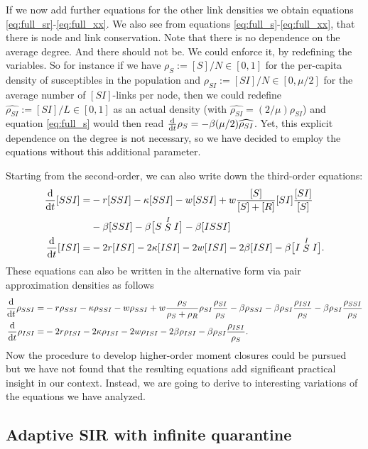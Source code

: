 \documentclass[12pt]{article}
\def\txtd{{\textnormal{d}}}
\begin{document}
If we now add further equations for the other link densities we obtain equations \eqref{eq:full_sr}-\eqref{eq:full_xx}. We also see from equations \eqref{eq:full_s}-\eqref{eq:full_xx}, that there is node and link conservation. Note that there is no dependence on the average degree. And there should not be. We could enforce it, by redefining the variables. So for instance if we have $\rho_S:= [S]/N \in [0,1]$ for the per-capita density of susceptibles in the population and $\rho_{SI}:=[SI]/N\in[0,\mu/2]$ for the average number of $[SI]$-links per node, then we could redefine $\widehat{\rho_{SI}}:=[SI]/L\in[0,1]$ as an actual density (with $\widehat{\rho_{SI}}=(2/\mu)\rho_{SI}$) and equation \eqref{eq:full_s} would then read $\frac{\txtd }{\txtd t} \rho_S= -\beta (\mu/2)\widehat{\rho_{SI}}$. Yet, this explicit dependence on the degree is not necessary, so we have decided to employ the equations without this additional parameter.\medskip

Starting from the second-order, we can also write down the third-order equations:
\begin{align*}
\frac{\txtd }{\txtd t}{[SSI]}=&
-r[SSI]- \kappa [SSI] - w[SSI] 
+w \frac{[S]}{[S]+[R]}[SI]\frac{[SI]}{[S]} \\
&- \beta [SSI] - \beta \big[S\stackrel{I}{S}I\big] - \beta [ISSI]\\
\frac{\txtd }{\txtd t}{[ISI]}=&
-2r[ISI]- 2\kappa [ISI] - 2w[ISI] 
 - 2\beta [ISI] - \beta \big[I\stackrel{I}{S}I\big].
\end{align*}
These equations can also be written in the alternative form via pair approximation densities as follows
\begin{align*}
\frac{\txtd }{\txtd t}{\rho_{SSI}}=&
-r\rho_{SSI}- \kappa \rho_{SSI} - w\rho_{SSI} 
+w \frac{\rho_{S}}{\rho_{S}+\rho_{R}}\rho_{SI}\frac{\rho_{SI}}{\rho_{S}} - \beta \rho_{SSI} - \beta \rho_{SI}\frac{\rho_{ISI}}{\rho_{S}}- \beta \rho_{SI}\frac{\rho_{SSI}}{\rho_{S}}
\\
\frac{\txtd }{\txtd t}{\rho_{ISI}}=&
-2r\rho_{ISI}- 2\kappa \rho_{ISI} - 2w\rho_{ISI} 
 - 2\beta \rho_{ISI} - \beta \rho_{SI}\frac{\rho_{ISI}}{\rho_{S}}.
\end{align*}
Now the procedure to develop higher-order moment closures could be pursued~\cite{KissMillerSimon} but we have not found that the resulting equations add significant practical insight in our context. Instead, we 
are going to derive to interesting variations of the equations we have analyzed.

\subsection{Adaptive SIR with infinite quarantine}
\end{document}
